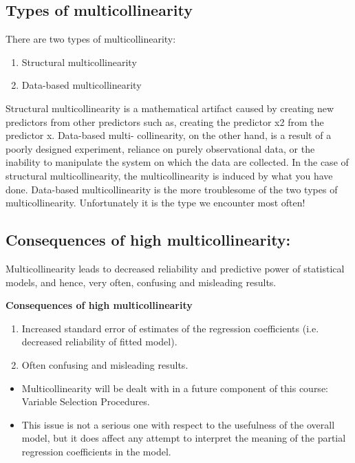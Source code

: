 \documentclass[a4paper,12pt]{article}
\begin{document}
\subsection{Types of multicollinearity}
There are two types of multicollinearity:
\begin{enumerate}
\item Structural multicollinearity
\item Data-based multicollinearity
\end{enumerate}
Structural multicollinearity is a mathematical artifact caused by creating new predictors from
other predictors such as, creating the predictor x2 from the predictor x. Data-based multi-
collinearity, on the other hand, is a result of a poorly designed experiment, reliance on purely
observational data, or the inability to manipulate the system on which the data are collected.
In the case of structural multicollinearity, the multicollinearity is induced by what you have
done. Data-based multicollinearity is the more troublesome of the two types of multicollinearity.
Unfortunately it is the type we encounter most often!
\subsection{Consequences of high multicollinearity:}
Multicollinearity leads to decreased reliability and predictive power of statistical models, and hence, very
often, confusing and misleading results.

\textbf{Consequences of high multicollinearity}\\
\begin{enumerate}
	\item Increased standard error of estimates of the regression coefficients (i.e. decreased reliability of fitted
	model).
	\item Often confusing and misleading results.
\end{enumerate}

\begin{itemize}
	\item  Multicollinearity will be dealt with in a future component of this course: Variable Selection Procedures.
	\item  This issue is not a serious one with respect to the usefulness of the overall model, but it does affect any attempt to interpret the meaning of the partial regression coefficients in the model.

\end{itemize}
\end{document}
